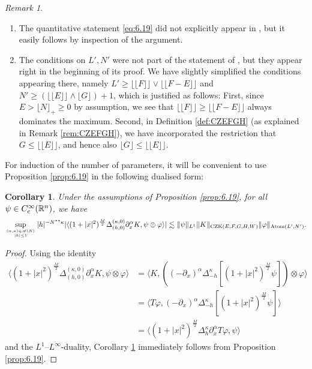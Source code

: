\documentclass[11pt, reqno]{amsart}
\newtheorem{corollary}[theorem]{Corollary}
\theoremstyle{definition}
\theoremstyle{remark}
\newtheorem{remark}[theorem]{Remark}
\numberwithin{equation}{section}
\newcommand{\R}{\mathbb R}
\newcommand{\floor}[1]{\lfloor #1 \rfloor}
\newcommand{\Floor}[1]{\lfloor\!\lfloor #1 \rfloor\!\rfloor}
\newcommand{\pair}[2]{\langle #1, #2 \rangle}
\newcommand{\abs}[1]{|#1|}
\newcommand{\Norm}[2]{\|#1\|_{#2}}
\begin{document}
\begin{remark}\label{rem:6.19}\mbox{}
\begin{enumerate}[\rm(i)]
\item The quantitative statement \eqref{eq:6.19} did not explicitly appear in \cite[Proposition 6.19]{BHYY:1c}, but it easily follows by inspection of the argument.
\item The conditions on $L',N'$ were not part of the statement of \cite[Proposition 6.19]{BHYY:1c}, but they appear right in the beginning of its proof. We have slightly simplified the conditions appearing there, namely $L'\geq\Floor{F}\vee\Floor{F-E}$ and $N'\geq(\Floor{E}\wedge\floor{G})+1$, which is justified as follows: First, since $E>\floor{N}_+\geq 0$ by assumption, we see that $\Floor{F}\geq\Floor{F-E}$ always dominates the maximum. Second, in Definition \ref{def:CZEFGH} (as explained in Remark \ref{rem:CZEFGH}), we have incorporated the restriction that $G\leq\Floor{E}$, and hence also $\floor{G}\leq\Floor{E}$.
\end{enumerate}
\end{remark}

For induction of the number of parameters, it will be convenient to use Proposition \ref{prop:6.19} in the following dualised form:

\begin{corollary}\label{cor:6.19}
Under the assumptions of Proposition \ref{prop:6.19}, for all $\psi\in C_{\rm c}^\infty(\R^n)$, we have
\begin{equation*}
  \sup_{\genfrac{}{}{0pt}{}{(\alpha,\kappa)\in\mathscr A(N)}{\abs{h}\leq 1}}\abs{h}^{-N^{**}\kappa}
  \abs{\pair{(1+\abs{x}^2)^{\frac{M}{2}}\Delta_{(h,0)}^{(\kappa,0)}\partial_x^\alpha K}{\psi\otimes \varphi}}
  \lesssim\Norm{\psi}{L^1}\Norm{K}{\operatorname{CZK}(E,F,G,H,W)}\Norm{\varphi}{\operatorname{Atom}(L',N')}.
\end{equation*}
\end{corollary}

\begin{proof}
Using the identity
\begin{equation*}
\begin{split}
  \pair{(1+\abs{x}^2)^{\frac{M}{2}}\Delta_{(h,0)}^{(\kappa,0)} \partial_x^\alpha K}{\psi\otimes \varphi}
  &=\pair{K}{((-\partial_x)^\alpha \Delta_{-h}^{\kappa} [(1+\abs{x}^2)^{\frac{M}{2}}\psi])\otimes \varphi} \\
  &=\pair{T\varphi}{(-\partial_x)^\alpha\Delta_{-h}^{\kappa}[(1+\abs{x}^2)^{\frac{M}{2}}\psi]} \\
  &=\pair{(1+\abs{x}^2)^{\frac{M}{2}}\Delta_{h}^{\kappa}\partial_x^\alpha T\varphi}{\psi}
\end{split}
\end{equation*}
and the $L^1$--$L^\infty$-duality, Corollary \ref{cor:6.19} immediately follows from Proposition \ref{prop:6.19}.
\end{proof}
\end{document}
